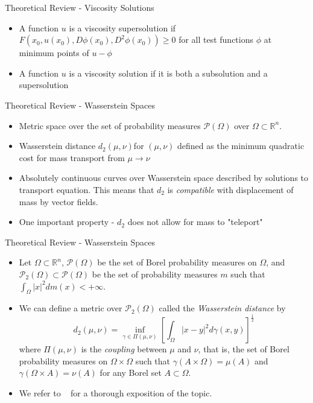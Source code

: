\documentclass{beamer}
\newcommand{\RR}[0]{\mathbb{R}}
\begin{document}
{\begin{frame}{Theoretical Review - Viscosity Solutions}
\begin{definition}
\begin{itemize}
        \item A function $u$ is a viscosity supersolution if
        $F(x_0, u(x_0), D\phi(x_0), D^2 \phi(x_0)) \geq 0$
        for all test functions $\phi$ at minimum points of $u - \phi$
        
        \item A function $u$ is a viscosity solution if it is both a subsolution and a supersolution
    \end{itemize}
\end{definition}

\end{frame}

\begin{frame}{Theoretical Review - Wasserstein Spaces}
    \begin{itemize}
        \item Metric space over the set of probability measures $\mathcal{P}(\Omega)$ over $\Omega \subset \RR^n$.
        \item Wasserstein distance $d_2(\mu, \nu)$for $(\mu, \nu)$ defined as the minimum quadratic cost for mass transport from $\mu \to \nu$
        \item Absolutely continuous curves over Wasserstein space described by solutions to transport equation. This means that $d_2$ is \textit{compatible } with displacement of mass by vector fields.
        \item One important property - $d_2$ does not allow for mass to "teleport" 
    \end{itemize}
\end{frame}

\begin{frame}{Theoretical Review - Wasserstein Spaces}

    \begin{itemize}
        \item Let $\Omega \subset \RR^n$, $\mathcal{P}(\Omega)$ be the set of Borel
probability measures on $\Omega$, and $\mathcal{P}_2(\Omega) \subset \mathcal{P}(\Omega)$
be the set of probability measures $m$ such that $\int_\Omega |x|^2 dm(x) < + \infty$.

        \item We can define a metric over $\mathcal{P}_2(\Omega)$ called the 
\textit{Wasserstein distance} by
\begin{equation}\label{prob_measures:wasserstein_distance}
    d_2(\mu, \nu) = \inf_{\gamma \in \Pi(\mu,\nu)} {\left[ \int_\Omega |x - y|^2 d\gamma(x,y) \right]}^{\frac{1}{2}}
\end{equation}
where $\Pi(\mu,\nu)$ is the \textit{coupling} between $\mu$  and $\nu$,
that is, the set of Borel probability measures on $\Omega \times \Omega$
such that $\gamma(A \times \Omega) = \mu(A)$ and $\gamma(\Omega \times A) = \nu(A)$
for any Borel set $A \subset \Omega$.
\item We refer to ~\cite{cardaliaguet2010notes,ambrosio2005gradient,ambrosio2021lectures} for a thorough exposition of the topic.
\end{itemize}


\end{frame}}
\end{document}
